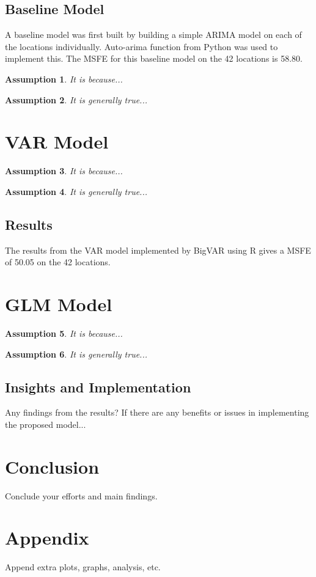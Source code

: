 \documentclass[10pt, letterpaper] {article}
\newtheorem{assumption}{Assumption}
\begin{document}
\subsection{Baseline Model}
A baseline model was first built by building a simple ARIMA model on each of the locations individually. Auto-arima function from Python was used to implement this. The MSFE for this baseline model on the 42 locations is 58.80. 
\begin{assumption}
It is because...
\end{assumption}
\begin{assumption}
It is generally true...
\end{assumption}

\section{VAR Model}
\begin{assumption}
It is because...
\end{assumption}
\begin{assumption}
It is generally true...
\end{assumption}

\subsection{Results}
The results from the VAR model implemented by BigVAR using R gives a MSFE of 50.05 on the 42 locations. 
\section{GLM Model}
\begin{assumption}
It is because...
\end{assumption}
\begin{assumption}
It is generally true...
\end{assumption}
\subsection{Insights and Implementation}
Any findings from the results? If there are any benefits or issues in implementing the proposed model...
\section{Conclusion}
Conclude your efforts and main findings.
\section{Appendix}
Append extra plots, graphs, analysis, etc.
\end{document}
